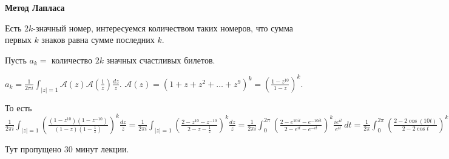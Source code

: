 \begin{example}
    \textbf{Метод Лапласа}

    Есть $2k$-значный номер, интересуемся количеством таких номеров, что сумма первых $k$ знаков равна сумме последних $k$.

    Пусть $a_k = $ количество $2k$ значных счастливых билетов.

    $a_k = \frac{1}{2\pi i} \int_{|z| = 1} \mathcal{A}(z) \mathcal{A}(\frac{1}{z}) \frac{dz}{z}$. $\mathcal{A}(z) = (1 + z + z^2 + \ldots + z^9)^k = \left ( \frac{1 - z^{10}}{1 - z} \right )^k$.

    То есть $\frac{1}{2 \pi i} \int_{|z| = 1} \left ( \frac{(1 - z^{10})(1 - z^{-10})}{(1 - z)(1 - \frac{1}{z})} \right )^k \frac{dz}{z}  = \frac{1}{2\pi i} \int_{|z| = 1} \left ( \frac{2 - z^{10} - z^{-10}}{2 - z - \frac{1}{z}} \right )^k \frac{dz}{z} = 
    \frac{1}{2\pi i} \int_{0}^{2\pi} \left ( \frac{2 - e^{10it} - e^{-10it}}{2 - e^{it} - e^{-it}} \right )^k \frac{ie^{it}}{e^{it}} \, dt = 
    \frac{1}{2\pi} \int_{0}^{2\pi} \left ( \frac{2 - 2 \cos (10 t)}{2 - 2\cos t} \right )^k \, dt = \frac{1}{2\pi} \int_{0}^{2\pi} \left ( \frac{2\sin^2 (st)}{2 \sin^2 \frac{t}{2}} \right )^k \, dt = \frac{1}{2\pi} \int_{0}^\pi 2\left ( \frac{\sin (10s)}{\sin s} \right )^{2k} \, ds  = 
    \frac{2}{\pi} \int_{0}^{\frac{\pi}{2}} \left( \frac{\sin (10x)}{\sin x} \right)^{2k}$

\end{example}

Тут пропущено 30 минут лекции.
